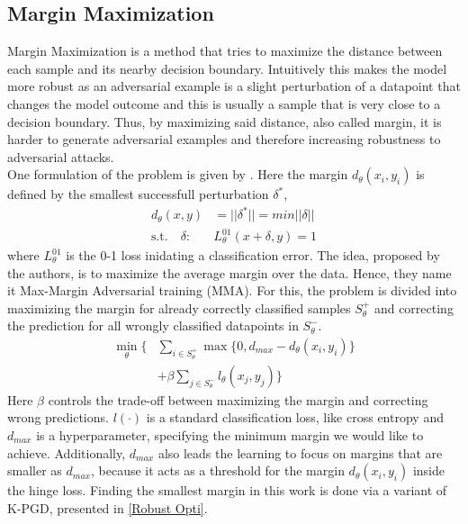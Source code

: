 \documentclass{article}
\begin{document}
\subsection{Margin Maximization}
Margin Maximization is a method that tries to maximize the distance between each sample and its nearby decision boundary. Intuitively this makes the model more robust as an adversarial example is a slight perturbation of a datapoint that changes the model outcome and this is usually a sample that is very close to a decision boundary. Thus, by maximizing said distance, also called margin, it is harder to generate adversarial examples and therefore increasing robustness to adversarial attacks. \\
One formulation of the problem is given by \cite{b1}. Here the margin $d_\theta(x_i, y_i)$ is defined by the smallest successfull perturbation $\delta^*$, 
\begingroup
\setlength\abovedisplayskip{0pt}
\setlength\belowdisplayskip{6pt}
\begin{align*}
  d_\theta(x,y) & = ||\delta^*|| = min ||\delta|| \\ 
  \text{s.t.} \quad \delta: & L_\theta^{01}(x+\delta, y) = 1
\end{align*}
\endgroup
where $L_\theta^{01}$ is the 0-1 loss inidating a classification error. The idea, proposed by the authors, is to maximize the average margin over the data. Hence, they name it Max-Margin Adversarial training (MMA). For this, the problem is divided into maximizing the margin for already correctly classified samples $S_{\theta}^{+}$ and correcting the prediction for all wrongly classified datapoints in $S_{\theta}^{-}$.
\begin{align*}
  \min_{\theta} \Big\{ & \sum_{i \in S_{\theta}^{+}} \max \{0, d_{max} - d_\theta(x_i, y_i)\} \\ 
  & + \beta \sum_{j \in S_{\theta}^{-}} l_\theta (x_j, y_j) \Big\}
\end{align*}
Here $\beta$ controls the trade-off between maximizing the margin and correcting wrong predictions. $l(\cdot)$ is a standard classification loss, like cross entropy and $d_{max}$ is a hyperparameter, specifying the minimum margin we would like to achieve. Additionally, $d_{max}$ also leads the learning to focus on margins that are smaller as $d_{max}$, because it acts as a threshold for the margin $d_\theta(x_i, y_i)$ inside the hinge loss. Finding the smallest margin in this work is done via a variant of K-PGD, presented in \ref{Robust Opti}.
  
\end{document}
